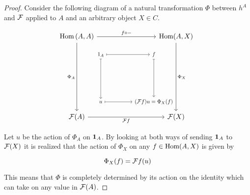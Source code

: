 \documentclass[../../main.tex]{subfiles}
\begin{document}
    \begin{proof}
        Consider the following diagram of a natural transformation $\Phi$ between $h^A$ and $\functor{F}$ applied to $A$ and an arbitrary object $X \in C$. 
        
            \[ 
            \stackinset{l}{13ex}{b}{6ex}{%
                \scalebox{.8}
                {%
                    \begin{tikzcd}[row sep=16ex, column sep = 11ex, ampersand replacement=\&]
                        1_A
                        \arrow[mapsto]{r}
                        \arrow[mapsto]{d}
                        \& f
                        \arrow[mapsto]{d}  \\
                        u
                        \arrow[mapsto]{r}
                        \& (\functor{F}f)u=\Phi_X(f)
                    \end{tikzcd}
                }
            }{%
                \begin{tikzcd}[row sep = 23ex, column sep = 20ex, ampersand replacement=\&]
                    \Hom \left(A,A\right)
                    \arrow{r}{f\circ-}
                    \arrow[swap]{d}{\Phi_A}
                    \& \Hom(A,X)
                    \arrow{d}{\Phi_X}  \\
                    \functor{F}(A)
                    \arrow[swap]{r}{\functor{F}f}
                    \& \functor{F}(X)
                \end{tikzcd}
            }
            \]

        Let $u$ be the action of $\Phi_A$ on $\idarrow[A]$. By looking at both ways of sending $\idarrow[A]$ to $\functor{F}(X)$ it is realized that the action of $\Phi_X$ on any $f \in \Hom(A, X)$ is given by 

        \begin{equation}
            \Phi_X(f) = \functor{F}f(u)
        \end{equation}
        
        This means that $\Phi$ is completely determined by its action on the identity which can take on any value in $\functor{F}(A)$.
    \end{proof}
\end{document}
